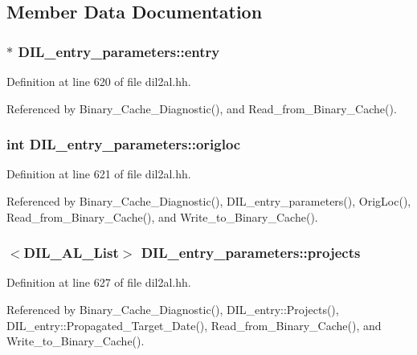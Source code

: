 \subsection{Member Data Documentation}
\subsubsection{$\ast$ DIL\_\-entry\_\-parameters::entry\hspace{0.3cm}{\tt  [protected]}}\label{classDIL__entry__parameters_n0}




Definition at line 620 of file dil2al.hh.

Referenced by Binary\_\-Cache\_\-Diagnostic(), and Read\_\-from\_\-Binary\_\-Cache().
\subsubsection{\setlength{\rightskip}{0pt plus 5cm}int DIL\_\-entry\_\-parameters::origloc\hspace{0.3cm}{\tt  [protected]}}\label{classDIL__entry__parameters_n1}




Definition at line 621 of file dil2al.hh.

Referenced by Binary\_\-Cache\_\-Diagnostic(), DIL\_\-entry\_\-parameters(), Orig\-Loc(), Read\_\-from\_\-Binary\_\-Cache(), and Write\_\-to\_\-Binary\_\-Cache().
\subsubsection{$<${\bf DIL\_\-AL\_\-List}$>$ DIL\_\-entry\_\-parameters::projects}\label{classDIL__entry__parameters_m1}




Definition at line 627 of file dil2al.hh.

Referenced by Binary\_\-Cache\_\-Diagnostic(), DIL\_\-entry::Projects(), DIL\_\-entry::Propagated\_\-Target\_\-Date(), Read\_\-from\_\-Binary\_\-Cache(), and Write\_\-to\_\-Binary\_\-Cache().
